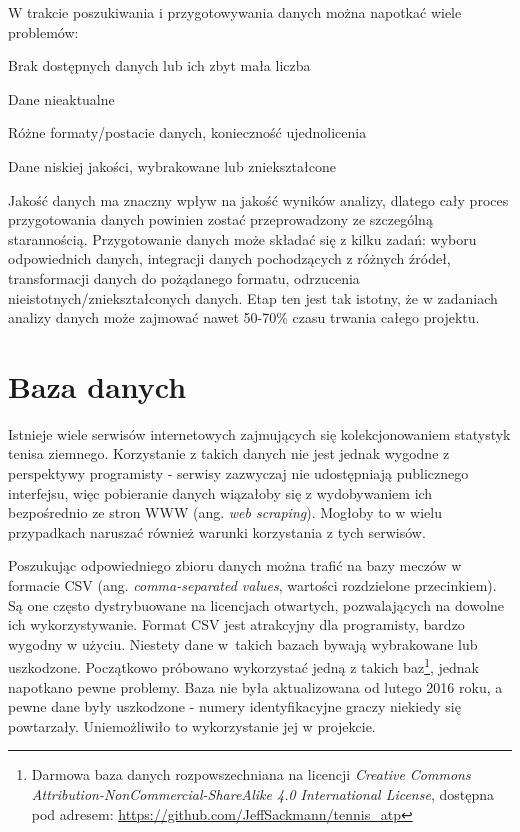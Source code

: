 W trakcie poszukiwania i przygotowywania danych można napotkać wiele problemów:
\begin{tightitemize}
\item Brak dostępnych danych lub ich zbyt mała liczba
\item Dane nieaktualne
\item Różne formaty/postacie danych, konieczność ujednolicenia
\item Dane niskiej jakości, wybrakowane lub zniekształcone
\end{tightitemize}

Jakość danych ma znaczny wpływ na jakość wyników analizy, dlatego cały proces przygotowania danych powinien zostać przeprowadzony ze szczególną starannością. Przygotowanie danych może składać się z kilku zadań: wyboru odpowiednich danych, integracji danych pochodzących z różnych źródeł, transformacji danych do pożądanego formatu, odrzucenia nieistotnych/zniekształconych danych. Etap ten jest tak istotny, że w zadaniach analizy danych może zajmować nawet 50-70\% czasu trwania całego projektu.\cite{satt01}

\section{Baza danych}
\label{Sec:DataBase}
Istnieje wiele serwisów internetowych zajmujących się kolekcjonowaniem statystyk tenisa ziemnego. Korzystanie z takich danych nie jest jednak wygodne z perspektywy programisty - serwisy zazwyczaj nie udostępniają publicznego interfejsu, więc pobieranie danych wiązałoby się z wydobywaniem ich bezpośrednio ze stron WWW (ang. \textit{web scraping}). Mogłoby to w wielu przypadkach naruszać również warunki korzystania z tych serwisów.

Poszukując odpowiedniego zbioru danych można trafić na bazy meczów w formacie CSV (ang. \textit{comma-separated values}, wartości rozdzielone przecinkiem). Są one często dystrybuowane na licencjach otwartych, pozwalających na dowolne ich wykorzystywanie. Format CSV jest atrakcyjny dla programisty, bardzo wygodny w użyciu. Niestety dane w~takich bazach bywają wybrakowane lub uszkodzone. Początkowo próbowano wykorzystać jedną z takich baz\footnote{Darmowa baza danych rozpowszechniana na licencji \textit{Creative Commons Attribution-NonCommercial-ShareAlike 4.0 International License}, dostępna pod adresem: \url{https://github.com/JeffSackmann/tennis_atp}}, jednak napotkano pewne problemy. Baza nie była aktualizowana od lutego 2016 roku, a pewne dane były uszkodzone - numery identyfikacyjne graczy niekiedy się powtarzały. Uniemożliwiło to wykorzystanie jej w projekcie.

